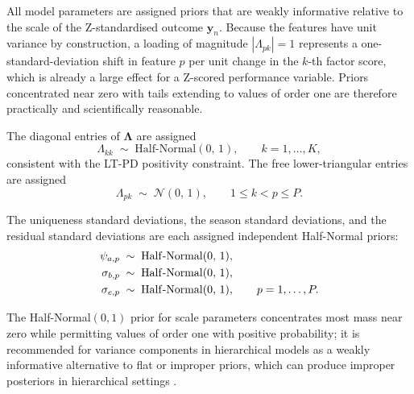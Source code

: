 All model parameters are assigned priors that are weakly informative relative to the scale of the Z-standardised outcome $\mathbf{y}_n$. Because the features have unit variance by construction, a loading of magnitude $|\Lambda_{pk}| = 1$ represents a one-standard-deviation shift in feature $p$ per unit change in the $k$-th factor score, which is already a large effect for a Z-scored performance variable. Priors concentrated near zero with tails extending to values of order one are therefore practically and scientifically reasonable.

\begin{definition}
\label{def:prior_lambda}
The diagonal entries of $\boldsymbol{\Lambda}$ are assigned
\begin{equation}
\Lambda_{kk} \;\sim\; \mathrm{Half\text{-}Normal}(0,\, 1), \qquad k = 1, \ldots, K,
\label{eq:prior_lambda_diag}
\end{equation}
consistent with the LT-PD positivity constraint. The free lower-triangular entries are assigned
\begin{equation}
\Lambda_{pk} \;\sim\; \mathcal{N}(0,\, 1), \qquad 1 \leq k < p \leq P.
\label{eq:prior_lambda_off}
\end{equation}
\end{definition}

\begin{definition}
\label{def:prior_variances}
The uniqueness standard deviations, the season standard deviations, and the residual standard deviations are each assigned independent Half-Normal priors:
\begin{align}
\psi_{a,p} &\;\sim\; \mathrm{Half\text{-}Normal}(0,\, 1), \notag \\
\sigma_{b,p} &\;\sim\; \mathrm{Half\text{-}Normal}(0,\, 1), \notag \\
\sigma_{e,p} &\;\sim\; \mathrm{Half\text{-}Normal}(0,\, 1), \qquad p = 1, \ldots, P.
\label{eq:prior_variances}
\end{align}
\end{definition}

The Half-Normal$(0,1)$ prior for scale parameters concentrates most mass near zero while permitting values of order one with positive probability; it is recommended for variance components in hierarchical models as a weakly informative alternative to flat or improper priors, which can produce improper posteriors in hierarchical settings \cite{gelman2006prior}.

